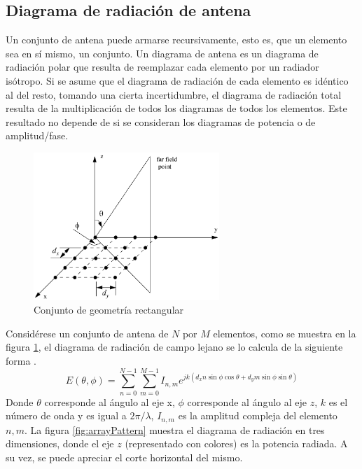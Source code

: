 \subsection{Diagrama de radiación de antena}

Un conjunto de antena puede armarse recursivamente, esto es, que un elemento sea en sí mismo, un conjunto. Un diagrama de antena es
un diagrama de radiación polar que resulta de reemplazar cada elemento por un radiador isótropo. Si se asume que el diagrama de
radiación de cada elemento es idéntico al del resto, tomando una cierta incertidumbre, el diagrama de radiación total resulta de
la multiplicación de todos los diagramas de todos los elementos. Este resultado no depende de si se consideran los diagramas de
potencia o de amplitud/fase. 

\begin{figure}[H]
 \centering
 \includegraphics[width=7cm]{gfx/rectangularArrayGeometry.png}
 \caption{Conjunto de geometría rectangular \cite{Mahafza2004}}
 \label{fig:arrayGeometry}
\end{figure}

Considérese un conjunto de antena de $N$ por $M$ elementos, como se muestra en la figura \ref{fig:arrayGeometry}, el diagrama de
radiación de campo lejano se lo calcula de la siguiente forma \cite{Mahafza2004}.
\begin{equation}
	E(\theta, \phi) = \sum_{n=0}^{N-1}\sum_{m=0}^{M-1} I_{n,m} e^{jk(d_xn\sin\phi\cos\theta + d_ym\sin\phi\sin\theta)}
\end{equation}
Donde $\theta$ corresponde al ángulo al eje x, $\phi$ corresponde al ángulo al eje $z$, $k$ es el número de onda y es igual
a $2\pi/\lambda$, $I_{n,m}$ es la amplitud compleja del elemento $n,m$. La figura \ref{fig:arrayPattern} muestra el diagrama de
radiación en tres dimensiones, donde el eje $z$ (representado con colores) es la potencia radiada. A su vez, se puede apreciar 
el corte horizontal del mismo.

